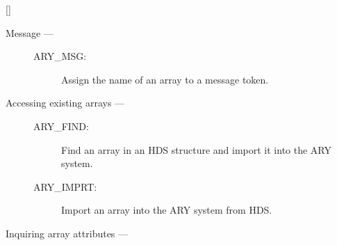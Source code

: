 \vspace{-9mm}

\hfill []

\vspace{2mm}

\begin{description}

\item [Message ---]

\begin{description}
\item [ARY\_MSG:]  Assign the name of an array to a message token.
\end{description}

\item [Accessing existing arrays ---]

\begin{description}
\item [ARY\_FIND:]  Find an array in an HDS structure and import it into the ARY system.
\item [ARY\_IMPRT:]  Import an array into the ARY system from HDS.
\end{description}

\item [Inquiring array attributes ---]


\end{description}
